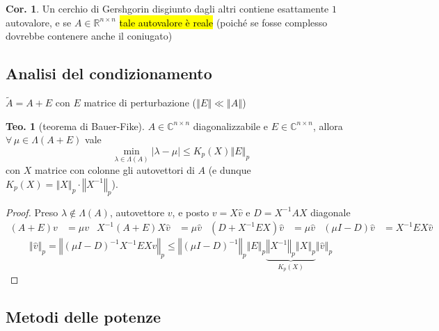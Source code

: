 \documentclass[a4paper,10pt]{article}
\theoremstyle{definition}
\theoremstyle{indentdefinition}
\theoremstyle{indenttheorem}
\newtheorem{thm}{Teo.}
\newtheorem{cor}{Cor.}
\theoremstyle{myremark}
\theoremstyle{indentgeneral}
\theoremstyle{plain}
\theoremstyle{plain}
\begin{document}
\begin{cor}
Un cerchio di Gershgorin disgiunto dagli altri contiene esattamente
$1$ autovalore, e se $A\in\mathbb{R}^{n\times n}$ \hl{tale autovalore
è reale} (poiché se fosse complesso dovrebbe contenere anche il coniugato)
\end{cor}


\subsection{Analisi del condizionamento}

$\widetilde{A}=A+E$ con $E$ matrice di perturbazione ($\left\Vert E\right\Vert \ll\left\Vert A\right\Vert $)
\begin{thm}[teorema di Bauer-Fike]
\label{thm:teorema-Bauer-Fike}$A\in\mathbb{C}^{n\times n}$ diagonalizzabile
e $E\in\mathbb{C}^{n\times n}$, allora $\forall\,\mu\in\Lambda\left(A+E\right)$
vale
\[
\min_{\lambda\in\Lambda\left(A\right)}\left|\lambda-\mu\right|\leq K_{p}\left(X\right)\left\Vert E\right\Vert _{p}
\]
con $X$ matrice con colonne gli autovettori di $A$ (e dunque $K_{p}\left(X\right)=\left\Vert X\right\Vert _{p}\cdot\left\Vert X^{-1}\right\Vert _{p}$).
\end{thm}

\begin{proof}
Preso $\lambda\notin\Lambda\left(A\right)$, autovettore $v$, e posto
$v=X\hat{v}$ e $D=X^{-1}AX$ diagonale
\begin{align*}
\left(A+E\right)v & =\mu v & X^{-1}\left(A+E\right)X\hat{v} & =\mu\hat{v} & \left(D+X^{-1}EX\right)\hat{v} & =\mu\hat{v} & \left(\mu I-D\right)\hat{v} & =X^{-1}EX\hat{v}
\end{align*}
\[
\left\Vert \hat{v}\right\Vert _{p}=\left\Vert \left(\mu I-D\right)^{-1}X^{-1}EX\hat{v}\right\Vert _{p}\leq\left\Vert \left(\mu I-D\right)^{-1}\right\Vert _{p}\left\Vert E\right\Vert _{p}\underset{K_{p}\left(X\right)}{\underbrace{\left\Vert X^{-1}\right\Vert _{p}\left\Vert X\right\Vert _{p}}}\left\Vert \hat{v}\right\Vert _{p}
\]
\end{proof}

\subsection{Metodi delle potenze}
\end{document}
